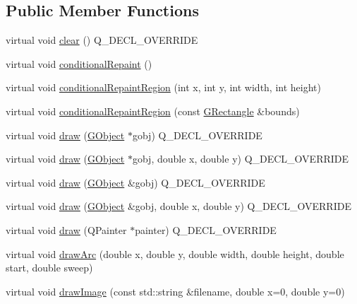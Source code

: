 \subsection*{Public Member Functions}
\begin{DoxyCompactItemize}
\item 
virtual void \mbox{\hyperlink{classGForwardDrawingSurface_af220cadd1499c3586d48010a0348d9f8}{clear}} () Q\+\_\+\+D\+E\+C\+L\+\_\+\+O\+V\+E\+R\+R\+I\+DE
\item 
virtual void \mbox{\hyperlink{classGDrawingSurface_a221b3e75bb3d9d0bfea62b3364e6773b}{conditional\+Repaint}} ()
\item 
virtual void \mbox{\hyperlink{classGDrawingSurface_aedd4b792311d946eeaf44b0de337a408}{conditional\+Repaint\+Region}} (int x, int y, int width, int height)
\item 
virtual void \mbox{\hyperlink{classGDrawingSurface_a3932a12278752db368e24fa404e446aa}{conditional\+Repaint\+Region}} (const \mbox{\hyperlink{classGRectangle}{G\+Rectangle}} \&bounds)
\item 
virtual void \mbox{\hyperlink{classGForwardDrawingSurface_a00bf9d87527d59e6f11756589c25e4e7}{draw}} (\mbox{\hyperlink{classGObject}{G\+Object}} $\ast$gobj) Q\+\_\+\+D\+E\+C\+L\+\_\+\+O\+V\+E\+R\+R\+I\+DE
\item 
virtual void \mbox{\hyperlink{classGForwardDrawingSurface_aa3894eb70ef929191bea127a39d1f9f6}{draw}} (\mbox{\hyperlink{classGObject}{G\+Object}} $\ast$gobj, double x, double y) Q\+\_\+\+D\+E\+C\+L\+\_\+\+O\+V\+E\+R\+R\+I\+DE
\item 
virtual void \mbox{\hyperlink{classGForwardDrawingSurface_a6dcc6b7c3c5266f9634c61e01e097f2a}{draw}} (\mbox{\hyperlink{classGObject}{G\+Object}} \&gobj) Q\+\_\+\+D\+E\+C\+L\+\_\+\+O\+V\+E\+R\+R\+I\+DE
\item 
virtual void \mbox{\hyperlink{classGForwardDrawingSurface_a5e76aee0d6572049baceef716b14b36c}{draw}} (\mbox{\hyperlink{classGObject}{G\+Object}} \&gobj, double x, double y) Q\+\_\+\+D\+E\+C\+L\+\_\+\+O\+V\+E\+R\+R\+I\+DE
\item 
virtual void \mbox{\hyperlink{classGForwardDrawingSurface_ae0e86a4511cc3643db793e5212b44b4c}{draw}} (Q\+Painter $\ast$painter) Q\+\_\+\+D\+E\+C\+L\+\_\+\+O\+V\+E\+R\+R\+I\+DE
\item 
virtual void \mbox{\hyperlink{classGDrawingSurface_a38b6fae1045191c57092b49905068144}{draw\+Arc}} (double x, double y, double width, double height, double start, double sweep)
\item 
virtual void \mbox{\hyperlink{classGDrawingSurface_abdd4cb1f2c64adc5d03522a1ee30febf}{draw\+Image}} (const std\+::string \&filename, double x=0, double y=0)

\end{DoxyCompactItemize}
